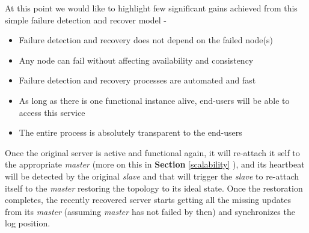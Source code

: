 \documentclass[12pt]{article}
\begin{document}
At this point we would like to highlight few significant gains achieved from this simple failure
detection and recover model - 
\begin{itemize} 
\item Failure detection and recovery does not depend on the failed node(s) 
\item Any node can fail without affecting availability and consistency 
\item Failure detection and recovery processes are automated and fast 
\item As long as there is one functional instance alive, end-users will be able to access 
this service 
\item The entire process is absolutely transparent to the end-users 
\end{itemize} 
Once the original server is active and functional again, it will re-attach it self to the
appropriate \emph{master} (more on this in \textbf{Section }\ref{scalability} ),
and its heartbeat will be detected by the original \emph{slave} and that will
trigger the \emph{slave} to re-attach itself to the \emph{master} restoring the
topology to its ideal state. Once the restoration completes, the recently
recovered server starts getting all the missing updates from its \emph{master}
(assuming \emph{master} has not failed by then) and synchronizes the log
position. 
\end{document}
